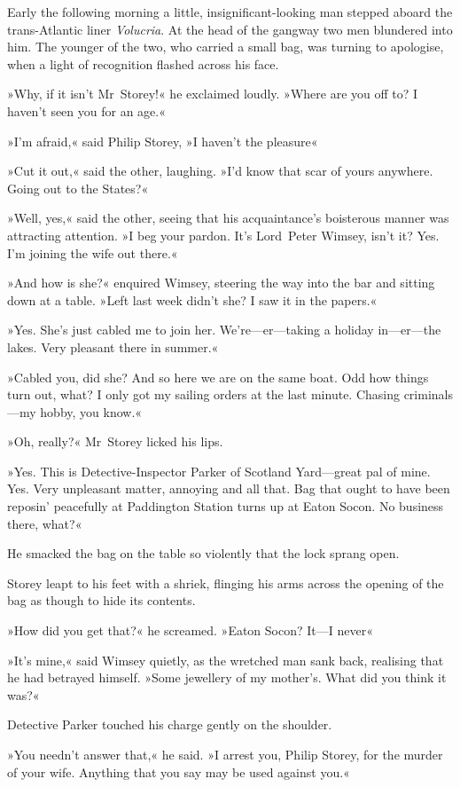 \divider
Early the following morning a little, insignificant-looking man stepped aboard the trans-Atlantic liner \textit{Volucria}. At the head of the gangway two men blundered into him. The younger of the two, who carried a small bag, was turning to apologise, when a light of recognition flashed across his face.

»Why, if it isn't Mr~Storey!« he exclaimed loudly. »Where are you off to? I haven't seen you for an age.«

»I'm afraid,« said Philip Storey, »I haven't the pleasure\longdash«

»Cut it out,« said the other, laughing. »I'd know that scar of yours anywhere. Going out to the States?«

»Well, yes,« said the other, seeing that his acquaintance's boisterous manner was attracting attention. »I beg your pardon. It's Lord~Peter Wimsey, isn't it? Yes. I'm joining the wife out there.«

»And how is she?« enquired Wimsey, steering the way into the bar and sitting down at a table. »Left last week didn't she? I saw it in the papers.«

»Yes. She's just cabled me to join her. We're—er—taking a holiday in—er—the lakes. Very pleasant there in summer.«

»Cabled you, did she? And so here we are on the same boat. Odd how things turn out, what? I only got my sailing orders at the last minute. Chasing criminals—my hobby, you know.«

»Oh, really?« Mr~Storey licked his lips.

»Yes. This is Detective-Inspector Parker of Scotland Yard—great pal of mine. Yes. Very unpleasant matter, annoying and all that. Bag that ought to have been reposin' peacefully at Paddington Station turns up at Eaton Socon. No business there, what?«

He smacked the bag on the table so violently that the lock sprang open.

Storey leapt to his feet with a shriek, flinging his arms across the opening of the bag as though to hide its contents.

»How did you get that?« he screamed. »Eaton Socon? It—I never\longdash«

»It's mine,« said Wimsey quietly, as the wretched man sank back, realising that he had betrayed himself. »Some jewellery of my mother's. What did you think it was?«

Detective Parker touched his charge gently on the shoulder.

»You needn't answer that,« he said. »I arrest you, Philip Storey, for the murder of your wife. Anything that you say may be used against you.«